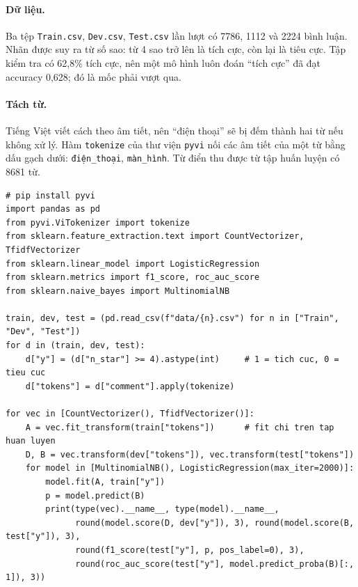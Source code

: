 \paragraph{Dữ liệu.} Ba tệp \texttt{Train.csv}, \texttt{Dev.csv}, \texttt{Test.csv} lần lượt có 7786, 1112 và 2224 bình luận. Nhãn được suy ra từ số sao: từ 4 sao trở lên là tích cực, còn lại là tiêu cực. Tập kiểm tra có 62,8\% tích cực, nên một mô hình luôn đoán ``tích cực'' đã đạt accuracy 0,628; đó là mốc phải vượt qua.

\paragraph{Tách từ.} Tiếng Việt viết cách theo âm tiết, nên ``điện thoại'' sẽ bị đếm thành hai từ nếu không xử lý. Hàm \texttt{tokenize} của thư viện \texttt{pyvi} nối các âm tiết của một từ bằng dấu gạch dưới: \texttt{điện\_thoại}, \texttt{màn\_hình}. Từ điển thu được từ tập huấn luyện có 8681 từ.

\begin{lstlisting}[caption={Lab 7 -- tách từ, vector hóa và so sánh mô hình}]
# pip install pyvi
import pandas as pd
from pyvi.ViTokenizer import tokenize
from sklearn.feature_extraction.text import CountVectorizer, TfidfVectorizer
from sklearn.linear_model import LogisticRegression
from sklearn.metrics import f1_score, roc_auc_score
from sklearn.naive_bayes import MultinomialNB

train, dev, test = (pd.read_csv(f"data/{n}.csv") for n in ["Train", "Dev", "Test"])
for d in (train, dev, test):
    d["y"] = (d["n_star"] >= 4).astype(int)     # 1 = tich cuc, 0 = tieu cuc
    d["tokens"] = d["comment"].apply(tokenize)

for vec in [CountVectorizer(), TfidfVectorizer()]:
    A = vec.fit_transform(train["tokens"])      # fit chi tren tap huan luyen
    D, B = vec.transform(dev["tokens"]), vec.transform(test["tokens"])
    for model in [MultinomialNB(), LogisticRegression(max_iter=2000)]:
        model.fit(A, train["y"])
        p = model.predict(B)
        print(type(vec).__name__, type(model).__name__,
              round(model.score(D, dev["y"]), 3), round(model.score(B, test["y"]), 3),
              round(f1_score(test["y"], p, pos_label=0), 3),
              round(roc_auc_score(test["y"], model.predict_proba(B)[:, 1]), 3))
\end{lstlisting}

